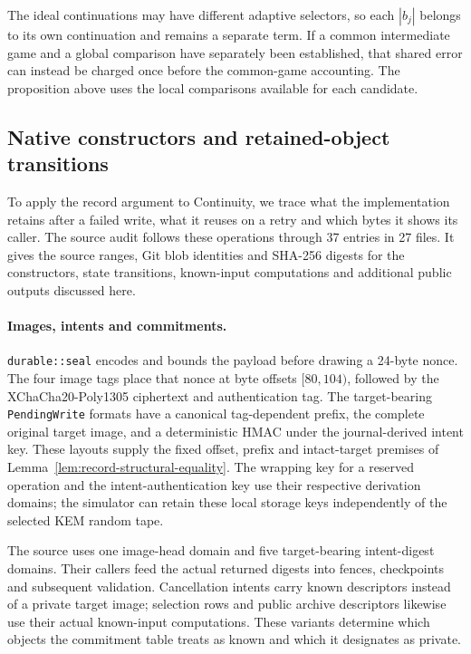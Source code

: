 \documentclass[pdflatex]{sn-jnl}
\theoremstyle{thmstyleone}
\theoremstyle{thmstylethree}
\theoremstyle{thmstyletwo}
\begin{document}
The ideal continuations may have different adaptive selectors, so each
$|b_j|$ belongs to its own continuation and remains a separate term.
If a common intermediate game and a global
comparison have separately been established, that shared error can instead be
charged once before the common-game accounting. The proposition above uses
the local comparisons available for each candidate.
\subsection{Native constructors and retained-object transitions}
\label{sec:native-correspondence}

To apply the record argument to Continuity, we trace what the
implementation retains after a failed write, what it reuses on a retry
and which bytes it shows its caller. The source audit follows these
operations through 37 entries in 27 files. It gives the source ranges,
Git blob identities and SHA-256 digests for the constructors, state
transitions, known-input computations and additional public outputs
discussed here.

\paragraph{Images, intents and commitments.}
\texttt{durable::seal} encodes and bounds the payload before drawing a
24-byte nonce. The four image tags place that nonce at byte offsets
$[80,104)$, followed by the XChaCha20-Poly1305 ciphertext and authentication
tag. The target-bearing \texttt{PendingWrite} formats have a canonical
tag-dependent prefix, the complete original target image, and a deterministic
HMAC under the journal-derived intent key. These layouts supply the fixed
offset, prefix and intact-target premises of
Lemma~\ref{lem:record-structural-equality}. The wrapping key for a reserved
operation and the intent-authentication key use their respective derivation
domains; the simulator can retain these local storage keys independently of
the selected KEM random tape.

The source uses one image-head domain and five target-bearing intent-digest
domains. Their callers feed the actual returned digests into fences,
checkpoints and subsequent validation. Cancellation intents carry known
descriptors instead of a private target image; selection rows and public
archive descriptors likewise use their actual known-input computations.
These variants determine which objects the commitment table treats as known
and which it designates as private.
\end{document}
